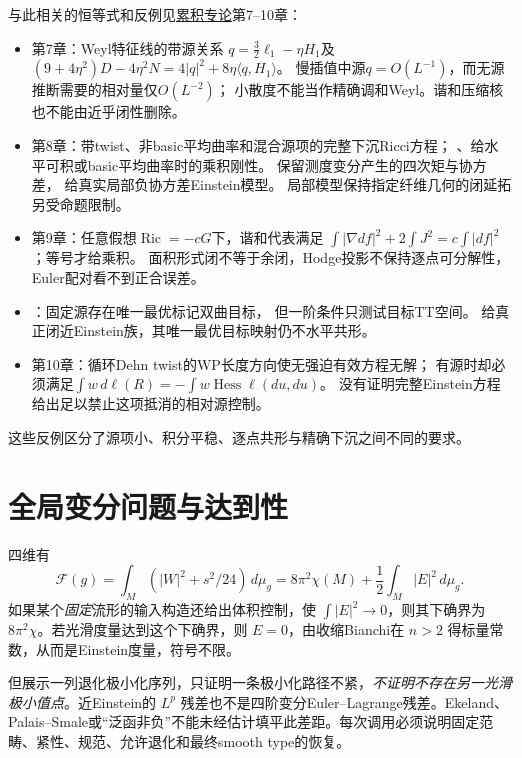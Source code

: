 \documentclass[UTF8,a4paper,11pt,fontset=fandol]{ctexart}
\numberwithin{equation}{section}
\theoremstyle{definition}
\newcommand{\Ric}{\operatorname{Ric}}
\newcommand{\dd}{\,d\mu_g}
\begin{document}
与此相关的恒等式和反例见\href{20260912.tex}{累积专论}第7--10章：
\begin{itemize}
\item 第7章：Weyl特征线的带源关系
$q=\tfrac32\ell_1-\eta H_1$及
$(9+4\eta^2)D-4\eta^2N=4|q|^2+8\eta\langle q,H_1\rangle$。
慢插值中源$q=O(L^{-1})$，而无源推断需要的相对量仅$O(L^{-2})$；
小散度不能当作精确调和Weyl。谐和压缩核也不能由近乎闭性删除。
\item 第8章：带twist、非basic平均曲率和混合源项的完整下沉Ricci方程；
、给水平可积或basic平均曲率时的乘积刚性。
保留测度变分产生的四次矩与协方差，
给真实局部负协方差Einstein模型。
局部模型保持指定纤维几何的闭延拓另受命题限制。
\item 第9章：任意假想$\Ric=-cG$下，谐和代表满足
$\int|\nabla df|^2+2\int J^2=c\int|df|^2$；等号才给乘积。
面积形式闭不等于余闭，Hodge投影不保持逐点可分解性，Euler配对看不到正合误差。
\item {}：固定源存在唯一最优标记双曲目标，
但一阶条件只测试目标TT空间。
给真正闭近Einstein族，其唯一最优目标映射仍不水平共形。
\item 第10章：循环Dehn twist的WP长度方向使无强迫有效方程无解；
有源时却必须满足$\int w\,d\ell(R)=-\int w\operatorname{Hess}\ell(du,du)$。
没有证明完整Einstein方程给出足以禁止这项抵消的相对源控制。
\end{itemize}
这些反例区分了源项小、积分平稳、逐点共形与精确下沉之间不同的要求。

\section{全局变分问题与达到性}
四维有
\begin{equation}\label{eq:F}
\mathcal F(g)=\int_M(|W|^2+s^2/24)\dd
=8\pi^2\chi(M)+\frac12\int_M|E|^2\dd.
\end{equation}
如果某个\emph{固定}流形的输入构造还给出体积控制，使 $\int|E|^2\to0$，则其下确界为 $8\pi^2\chi$。若光滑度量达到这个下确界，则 $E=0$，由收缩Bianchi在 $n>2$ 得标量常数，从而是Einstein度量，符号不限。

但展示一列退化极小化序列，只证明一条极小化路径不紧，\emph{不证明不存在另一光滑极小值点}。近Einstein的 $L^p$ 残差也不是四阶变分Euler--Lagrange残差。Ekeland、Palais--Smale或“泛函非负”不能未经估计填平此差距。每次调用必须说明固定范畴、紧性、规范、允许退化和最终smooth type的恢复。
\end{document}
